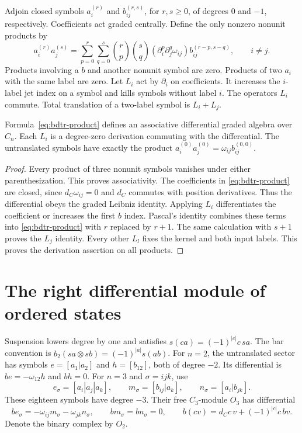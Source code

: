Adjoin closed symbols $a_i^{(r)}$ and $b_{ij}^{(r,s)}$, for $r,s\geq0$, of degrees $0$ and $-1$, respectively.
Coefficients act graded centrally.
Define the only nonzero nonunit products by
\begin{equation}\label{eq:bdtr-product}
 a_i^{(r)}a_j^{(s)}
 =\sum_{p=0}^r\sum_{q=0}^s
 \binom rp\binom sq
 (\partial_i^p\partial_j^q\omega_{ij})
 b_{ij}^{(r-p,s-q)},\qquad i\ne j.
\end{equation}
Products involving a $b$ and another nonunit symbol are zero.
Products of two $a_i$ with the same label are zero.
Let $L_i$ act by $\partial_i$ on coefficients.
It increases the $i$-label jet index on a symbol and kills symbols without label $i$.
The operators $L_i$ commute.
Total translation of a two-label symbol is $L_i+L_j$.

\begin{proposition}\label{prop:bdtr-state-algebra}
Formula~\eqref{eq:bdtr-product} defines an associative differential graded algebra over $C_n$.
Each $L_i$ is a degree-zero derivation commuting with the differential.
The untranslated symbols have exactly the product $a_i^{(0)}a_j^{(0)}=\omega_{ij}b_{ij}^{(0,0)}$.
\end{proposition}
\begin{proof}
Every product of three nonunit symbols vanishes under either parenthesization.
This proves associativity.
The coefficients in \eqref{eq:bdtr-product} are closed, since $d_C\omega_{ij}=0$ and $d_C$ commutes with position derivatives.
Thus the differential obeys the graded Leibniz identity.
Applying $L_i$ differentiates the coefficient or increases the first $b$ index.
Pascal's identity combines these terms into \eqref{eq:bdtr-product} with $r$ replaced by $r+1$.
The same calculation with $s+1$ proves the $L_j$ identity.
Every other $L_l$ fixes the kernel and both input labels.
This proves the derivation assertion on all products.
\end{proof}

\section{The right differential module of ordered states}

Suspension lowers degree by one and satisfies $s(ca)=(-1)^{|c|}c\,sa$.
The bar convention is $b_2(sa\otimes sb)=(-1)^{|a|}s(ab)$.
For $n=2$, the untranslated sector has symbols
$e=[a_1|a_2]$ and $h=[b_{12}]$, both of degree $-2$.
Its differential is $be=-\omega_{12}h$ and $bh=0$.
For $n=3$ and $\sigma=ijk$, use
\[
 e_\sigma=[a_i|a_j|a_k],\qquad
 m_\sigma=[b_{ij}|a_k],\qquad
 n_\sigma=[a_i|b_{jk}].
\]
These eighteen symbols have degree $-3$.
Their free $C_3$-module $O_3$ has differential
\begin{equation}\label{eq:bdtr-original-bar}
 be_\sigma=-\omega_{ij}m_\sigma-\omega_{jk}n_\sigma,
 \qquad bm_\sigma=bn_\sigma=0,
 \qquad b(cv)=d_Cc\,v+(-1)^{|c|}c\,bv.
\end{equation}
Denote the binary complex by $O_2$.

